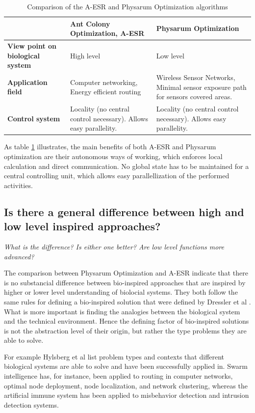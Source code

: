 \documentclass[cameraready]{IWORK2014}
\begin{document}
\begin{table}
	\begin{tabularx}{\linewidth}{|X|X|X|}
		\hline & \textbf{Ant Colony Optimization, A-ESR} & \textbf{Physarum Optimization} \\ \hline
		\textbf{View point on biological system} & High level & Low level \\ \hline
		\textbf{Application field} & Computer networking, Energy efficient routing & Wireless Sensor Networks, Minimal sensor exposure path for sensors covered areas. \\ 	\hline
		\textbf{Control system} & Locality (no central control necessary). Allows easy parallelity. & Locality (no central control necessary). Allows easy parallelity. \\ \hline
	\end{tabularx}
	\caption{Comparison of the A-ESR and Physarum Optimization algorithms}
	\label{tbl:aco-po-comparison}
\end{table}

As table \ref{tbl:aco-po-comparison} illustrates, the main benefits of both A-ESR and Physarum optimization are their autonomous ways of working, which enforces local calculation and direct communication. No global state has to be maintained for a central controlling unit, which allows easy parallellization of the performed activities.

\subsection{Is there a general difference between high and low level inspired approaches?}
\textit{What is the difference? Is either one better? Are low level functions more advanced?}

The comparison between Physarum Optimization and A-ESR indicate that there is no substancial difference between bio-inspired approaches that are inspired by higher or lower level understanding of biolocial systems. They both follow the same rules for defining a bio-inspired solution that were defined by Dressler et al \cite{dressler2010bio}. What is more important is finding the analogies between the biological system and the technical environment. Hence the defining factor of bio-inspired solutions is not the abstraction level of their origin, but rather the type problems they are able to solve.

For example Hylsberg et al \cite{hylsberg2011bioinspired} list problem types and contexts that different biological systems are able to solve and have been successfully applied in. Swarm intelligence has, for instance, been applied to routing in computer networks, optimal node deployment, node localization, and network clustering, whereas the artificial immune system has been applied to misbehavior detection and intrusion detection systems.
\end{document}
